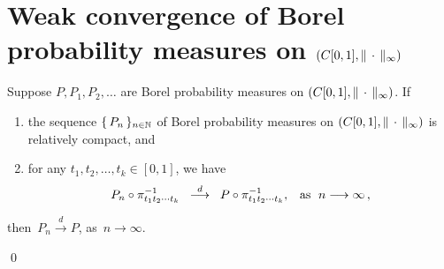 

\section{Weak convergence of Borel probability measures on $\left(C[0,1],\Vert\,\cdot\,\Vert_{\infty}\right)$}
\setcounter{theorem}{0}
\setcounter{equation}{0}

\renewcommand{\theenumi}{\roman{enumi}}
\renewcommand{\labelenumi}{\textnormal{(\theenumi)}$\;\;$}

\begin{theorem}
\mbox{}\vskip 0.1cm
\noindent
Suppose $P, P_{1}, P_{2}, \ldots $ are Borel probability measures on $\left(C[0,1],\Vert\,\cdot\,\Vert_{\infty}\right)$.
If
\begin{enumerate}
\item	the sequence $\{\,P_{n}\,\}_{n\in\mathbb{N}}$ of Borel probability measures
		on $\left(C[0,1],\Vert\,\cdot\,\Vert_{\infty}\right)$ is relatively compact, and
\item	for any $t_{1}, t_{2}, \ldots, t_{k} \in [0,1]$, we have
		\begin{equation*}
		P_{n}\circ\pi_{t_{1}t_{2}\cdots t_{k}}^{-1}
		\;\;\overset{d}{\longrightarrow}\;\;
		P\circ\pi_{t_{1}t_{2}\cdots t_{k}}^{-1},
		\;\;\;
		\textnormal{as \;$n \longrightarrow \infty$}\,,
		\end{equation*}
\end{enumerate}
then \,$P_{n} \overset{d}{\longrightarrow} P$, as \,$n \longrightarrow \infty$.
\end{theorem}
\proof

\qed

